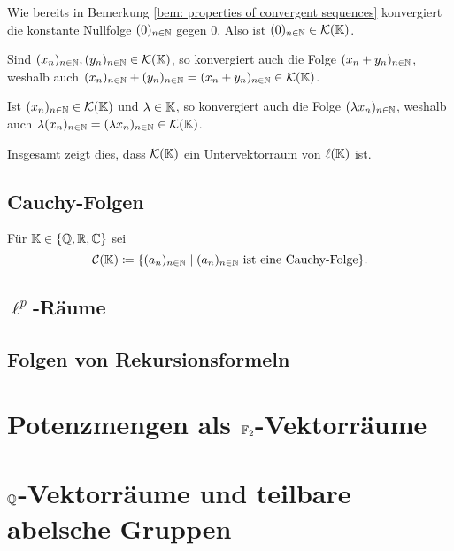 Wie bereits in Bemerkung \ref{bem: properties of convergent sequences} konvergiert die konstante Nullfolge $(0)_{n \in \mathbb{N}}$ gegen $0$. Also ist $(0)_{n \in \mathbb{N}} \in \mathcal{K}(\mathbb{K})$.

Sind $(x_n)_{n \in \mathbb{N}}, (y_n)_{n \in \mathbb{N}} \in \mathcal{K}(\mathbb{K})$, so konvergiert auch die Folge $(x_n + y_n)_{n \in \mathbb{N}}$, weshalb auch $(x_n)_{n \in \mathbb{N}} + (y_n)_{n \in \mathbb{N}} = (x_n + y_n)_{n \in \mathbb{N}} \in \mathcal{K}(\mathbb{K})$.

Ist $(x_n)_{n \in \mathbb{N}} \in \mathcal{K}(\mathbb{K})$ und $\lambda \in \mathbb{K}$, so konvergiert auch die Folge $(\lambda x_n)_{n \in \mathbb{N}}$, weshalb auch $\lambda (x_n)_{n \in \mathbb{N}} = (\lambda x_n)_{n \in \mathbb{N}} \in \mathcal{K}(\mathbb{K})$.

Insgesamt zeigt dies, dass $\mathcal{K}(\mathbb{K})$ ein Untervektorraum von $\ell(\mathbb{K})$ ist.


\subsection{Cauchy-Folgen}
Für $\mathbb{K} \in \{\mathbb{Q}, \mathbb{R}, \mathbb{C}\}$ sei
\[
 \mathcal{C}(\mathbb{K})
 \coloneqq
 \{(a_n)_{n \in \mathbb{N}} \mid \text{$(a_n)_{n \in \mathbb{N}}$ ist eine Cauchy-Folge}\}.
\]


\subsection{\texorpdfstring{$\ell^p$}{lp}-Räume}


\subsection{}


\subsection{Folgen von Rekursionsformeln}





\section{Potenzmengen als \texorpdfstring{$\mathbb{F}_2$}{F2}-Vektorräume}





\section{\texorpdfstring{$\mathbb{Q}$}{Q}-Vektorräume und teilbare abelsche Gruppen}



